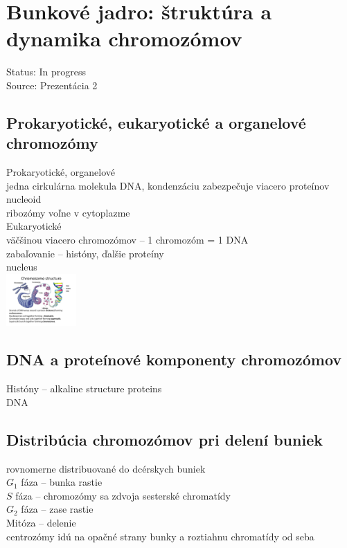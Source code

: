 \section{Bunkové jadro: štruktúra a dynamika chromozómov}
Status: In progress\\
Source: Prezentácia 2\\

\subsection{Prokaryotické, eukaryotické a organelové chromozómy}
Prokaryotické, organelové\\
\tab jedna cirkulárna molekula DNA, kondenzáciu zabezpečuje viacero proteínov\\
\tab nucleoid\\
\tab ribozómy voľne v cytoplazme\\
Eukaryotické\\
\tab väčšinou viacero chromozómov -- 1 chromozóm = 1 DNA\\
\tab zabaľovanie -- históny, ďalšie proteíny\\
\tab nucleus\\
\includegraphics[width=0.2\textwidth]{images/chromosome_dna}\\

\subsection{DNA a proteínové komponenty chromozómov}
Históny -- alkaline structure proteins\\
DNA\\
\subsection{Distribúcia chromozómov pri delení buniek}
rovnomerne distribuované do dcérskych buniek\\
$G_1$ fáza -- bunka rastie\\
$S$ fáza -- chromozómy sa zdvoja \ra sesterské chromatídy\\
$G_2$ fáza -- zase rastie\\
Mitóza -- delenie\\
\tab centrozómy idú na opačné strany bunky a roztiahnu chromatídy od seba\\
